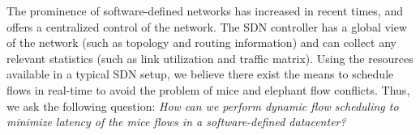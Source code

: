The prominence of software-defined networks has increased in recent times, and offers a centralized control of the network. The SDN controller has a global view of the network (such as topology and routing information) and can collect any relevant statistics (such as link utilization and traffic matrix). Using the resources available in a typical SDN setup, we believe there exist the means to schedule flows in real-time to avoid the problem of mice and elephant flow conflicts. Thus, we ask the following question: \emph{How can we perform dynamic flow scheduling to minimize latency of the mice flows in a software-defined datacenter? }  
